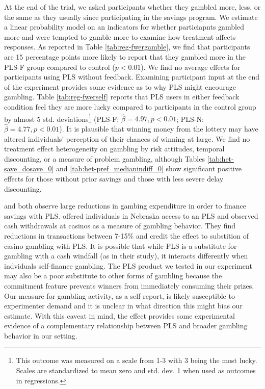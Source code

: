 \documentclass[11pt]{article}
\begin{document}
		At the end of the trial, we asked participants whether they gambled more, less, or the same as they usually since participating in the savings program. We estimate a linear probability model on an indicators for whether particiapnts gambled more and were tempted to gamble more to examine how treatment affects responses. As reported in Table \ref{tab:reg-fwergamble}, we find that participants are 15 percentage points more likely to report that they gambled more in the PLS-F group compared to control ($p < 0.01$). We find no average effects for participants using PLS without feedback. Examining participant input at the end of the experiment provides some evidence as to why PLS might encourage gambling. Table \ref{tab:reg-fwerself} reports that PLS users in either feedback condition feel they are more lucky compared to participants in the control group by almost 5 std. deviations\footnote{This outcome was measured on a scale from 1-3 with 3 being the most lucky. Scales are standardized to mean zero and std. dev. 1 when used as outcomes in regressions.} (PLS-F: $\hat \beta = 4.97, p < 0.01$; PLS-N: $\hat \beta = 4.77, p < 0.01$). It is plausible that winning money from the lottery may have altered individuals' perception of their chances of winning at large. We find no treatment effect heterogeneity on gambling by risk attitudes, temporal discounting, or a measure of problem gambling, although Tables \ref{tab:het-save_dosave_0} and \ref{tab:het-pref_medianindiff_0} show significant positive effects for those without prior savings and those with less severe delay discounting.

		\textcite{atalay_savings_2014} and \textcite{dizon_leveraging_2016} both observe large reductions in gambing expenditure in order to finance savings with PLS. \textcite{cookson_when_2016} offered individuals in Nebraska access to an PLS and observed cash withdrawals at casinos as a measure of gambling behavior. They find reductions in transactions between 7-15\% and credit the effect to substition of casino gambling with PLS. It is possible that while PLS is a substitute for gambling with a cash windfall (as in their study), it interacts differently when indviduals self-finance gambling. The PLS product we tested in our experiment may also be a poor substitute to other forms of gambling because the commitment feature prevents winners from immediately consuming their prizes. Our measure for gambling activity, as a self-report, is likely susceptible to experimenter demand and it is unclear in what direction this might bias our estimate. With this caveat in mind, the effect provides some experimental evidence of a complementary relationship between PLS and broader gambling behavior in our setting.
\end{document}
